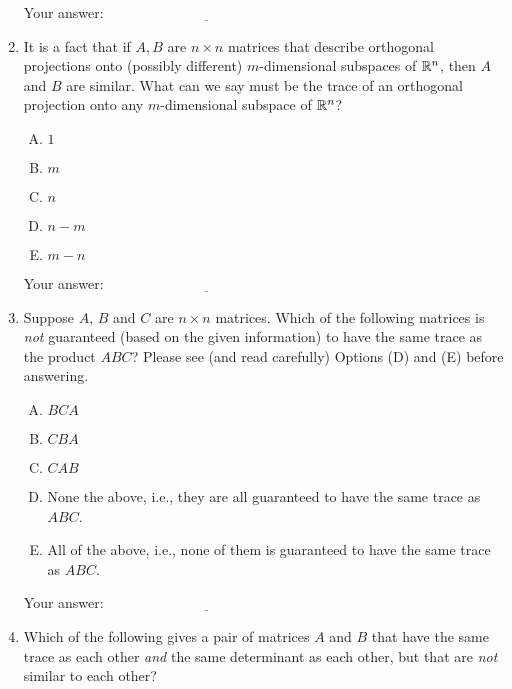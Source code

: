 \documentclass[10pt]{amsart}
\begin{document}
\begin{enumerate}
  \vspace{0.1in}
  Your answer: $\underline{\qquad\qquad\qquad\qquad\qquad\qquad\qquad}$
  \vspace{0.1in}

\item It is a fact that if $A,B$ are $n \times n$ matrices that
  describe orthogonal projections onto (possibly different)
  $m$-dimensional subspaces of $\mathbb{R}^n$, then $A$ and $B$ are
  similar. What can we say must be the trace of an orthogonal
  projection onto any $m$-dimensional subspace of $\mathbb{R}^n$?

  \begin{enumerate}[(A)]
  \item $1$
  \item $m$
  \item $n$
  \item $n - m$
  \item $m - n$
  \end{enumerate}

  \vspace{0.1in}
  Your answer: $\underline{\qquad\qquad\qquad\qquad\qquad\qquad\qquad}$
  \vspace{0.1in}

\item Suppose $A$, $B$ and $C$ are $n \times n$ matrices. Which of the
  following matrices is {\em not} guaranteed (based on the given
  information) to have the same trace as the product $ABC$? Please see
  (and read carefully) Options (D) and (E) before answering.

  \begin{enumerate}[(A)]
  \item $BCA$
  \item $CBA$
  \item $CAB$
  \item None the above, i.e., they are all guaranteed to have the same
    trace as $ABC$.
  \item All of the above, i.e., none of them is guaranteed to have the
    same trace as $ABC$.
  \end{enumerate}

  \vspace{0.1in}
  Your answer: $\underline{\qquad\qquad\qquad\qquad\qquad\qquad\qquad}$
  \vspace{0.1in}


\item Which of the following gives a pair of matrices $A$ and $B$ that
  have the same trace as each other {\em and} the same determinant as
  each other, but that are {\em not} similar to each other?


\end{enumerate}
\end{document}
